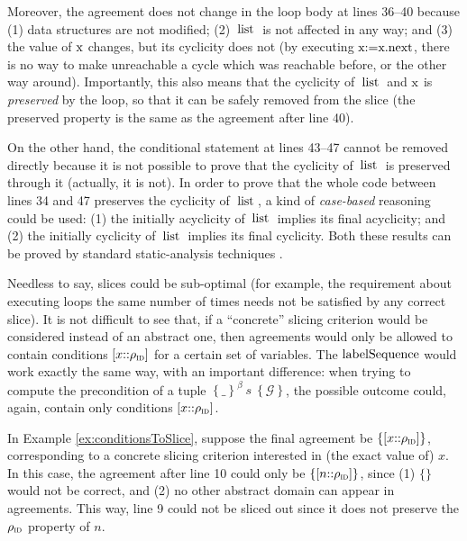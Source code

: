 \documentclass[prodmode,acmtocl]{acmsmall}
\def\uco{\ensuremath{\rho}\xspace}
\newcommand{\0}{\mbox{\bf 0}}
\newcommand{\CODE}[1]{\ensuremath{\mbox{\lstinline!#1!}\xspace}\xspace}
\def\IDDOM{\ensuremath{\uco_{\textsc{id}}}\xspace}
\def\PRED{\beta}
\def\AGREEM{\mathcal{G}}
\newcommand{\AGRS}[2]{[#2{::}#1]}
\newcommand{\TRIPLEB}[4]{\left\{#1\right\}^{#2}\ #3\ \left\{#4\right\}}
\begin{document}
\begin{example}
  Moreover, the agreement does not change in the loop body at lines
  36--40 because (1) data structures are not modified; (2) \CODE{list}
  is not affected in any way; and (3) the value of \CODE{x} changes,
  but its cyclicity does not (by executing \CODE{x:=x.next}, there is
  no way to make unreachable a cycle which was reachable before, or
  the other way around).  Importantly, this also means that the
  cyclicity of \CODE{list} and \CODE{x} is \emph{preserved} by the
  loop, so that it can be safely removed from the slice (the preserved
  property is the same as the agreement after line 40).
  
  On the other hand, the conditional statement at lines 43--47 cannot
  be removed directly because it is not possible to prove that the
  cyclicity of \CODE{list} is preserved through it (actually, it is
  not).  In order to prove that the whole code between lines 34 and 47
  preserves the cyclicity of \CODE{list}, a kind of \emph{case-based}
  reasoning could be used: (1) the initially acyclicity of \CODE{list}
  implies its final acyclicity; and (2) the initially cyclicity of
  \CODE{list} implies its final cyclicity.  Both these results can be
  proved by standard static-analysis techniques \cite{tcs13}.
\end{example}

Needless to say, slices could be sub-optimal (for example, the
requirement about executing loops the same number of times needs not
be satisfied by any correct slice).  It is not difficult to see that,
if a ``concrete'' slicing criterion would be considered instead of an
abstract one, then agreements would only be allowed to contain
conditions $\AGRS{\IDDOM}{x}$ for a certain set of variables.  The
\CODE{labelSequence} would work exactly the same way, with an
important difference: when trying to compute the precondition of a
tuple $\TRIPLEB{\_}{\PRED}{s}{\AGREEM}$, the possible outcome
could, again, contain only conditions $\AGRS{\IDDOM}{x}$.

\begin{example}
  \label{ex:conditionsToSlice1}
  In Example \ref{ex:conditionsToSlice}, suppose the final agreement
  be $\{ \AGRS{\IDDOM}{x} \}$, corresponding to a concrete slicing
  criterion interested in (the exact value of) $x$.  In this case, the
  agreement after line 10 could only be $\{ \AGRS{\IDDOM}{n} \}$,
  since (1) $\{\}$ would not be correct, and (2) no other abstract
  domain can appear in agreements.  This way, line 9 could not be
  sliced out since it does not preserve the $\IDDOM$ property of $n$.
\end{example}
\end{document}
